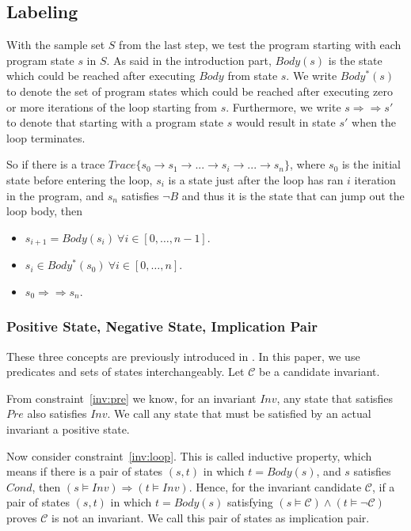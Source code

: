 
\subsection {Labeling}
\label{subsec:labeling}
With the sample set $S$ from the last step, we test the program starting with each program state $s$ in $S$. 
As said in the introduction part, $Body(s)$ is the state which could be reached after executing $Body$ from state $s$.
We write $Body^*(s)$ to denote the set of program states which could be reached after executing zero or more iterations of the loop starting from $s$.
Furthermore, we write $s \Rightarrow\Rightarrow s'$ to denote that starting with a program state $s$ would result in state $s'$ when the loop terminates. 

So if there is a trace $Trace\{s_0 \to s_1 \to ...\to s_i \to ... \to s_n\}$, 
where $s_0$ is the initial state before entering the loop, 
$s_i$ is a state just after the loop has ran $i$ iteration in the program,
and $s_n$ satisfies $\neg B$ and thus it is the state that can jump out the loop body,
then 
\begin{itemize}
\item $s_{i+1} = Body(s_i)\ \forall i \in [0, \ldots, n-1]$.
\item $s_{i} \in Body^*(s_0)\ \forall i \in [0, \ldots, n]$.
\item $s_{0} \Rightarrow\Rightarrow s_{n}$.
\end{itemize}



\subsubsection{Positive State, Negative State, Implication Pair}
\label{subsec:state}
These three concepts are previously introduced in \cite{sharma2014invariant}.
In this paper, we use predicates and sets of states interchangeably.
Let $\mathcal{C}$ be a candidate invariant.

From constraint~\ref{inv:pre} we know, for an invariant $Inv$, 
any state that satisfies $Pre$ also satisfies $Inv$. 
We call any state that must be satisfied by an actual invariant a positive state. 


Now consider constraint~\ref{inv:loop}.
This is called inductive property, which means if there is a pair of states $(s, t)$ in which $t = Body(s)$, 
and $s$ satisfies $Cond$, then $(s \models Inv) \Rightarrow (t \models {Inv})$. 
Hence, for the invariant candidate $\mathcal{C}$, 
if a pair of states $(s, t)$ in which $t = Body(s)$ satisfying $(s \models \mathcal{C}) \wedge (t \models \neg \mathcal{C})$ proves $\mathcal{C}$ is not an invariant. 
We call this pair of states as implication pair.

